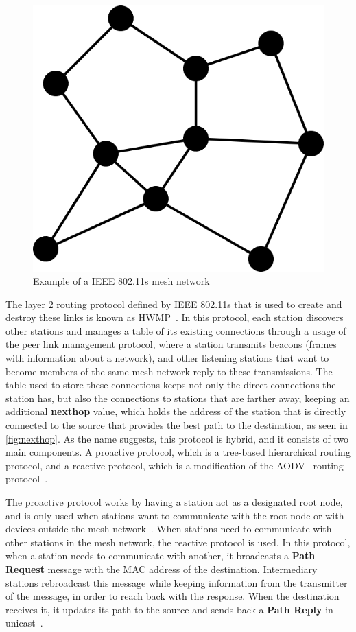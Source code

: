 \begin{figure}[htb]
   \centering
   \includegraphics[scale=.4]{meshnet}
   \caption{Example of a \ac{IEEE} 802.11s mesh network}\label{fig:meshnet}
\end{figure}

The layer 2 routing protocol defined by \ac{IEEE} 802.11s that is used to create
and destroy these links is known as \ac{HWMP}~\cite{ieee80211}. In this
protocol, each station discovers other stations and manages a table of its
existing connections through a usage of the peer link management protocol, where
a station transmits beacons (frames with information about a network), and other
listening stations that want to become members of the same mesh network reply to
these transmissions. The table used to store these connections keeps not only
the direct connections the station has, but also the connections to stations
that are farther away, keeping an additional \textbf{nexthop} value, which holds
the address of the station that is directly connected to the source that
provides the best path to the destination, as seen in \autoref{fig:nexthop}. As
the name suggests, this protocol is hybrid, and it consists of two main
components. A proactive protocol, which is a tree-based hierarchical routing
protocol, and a reactive protocol, which is a modification of the
\ac{AODV}~\cite{aodv} routing protocol~\cite{ieee80211s}.

The proactive protocol works by having a station act as a designated root node,
and is only used when stations want to communicate with the root node or with
devices outside the mesh network~\cite{hwmpproa,hwmpperf}. When stations need to
communicate with other stations in the mesh network, the reactive protocol is
used. In this protocol, when a station needs to communicate with another, it
broadcasts a \textbf{Path Request} message with the \ac{MAC} address of the
destination. Intermediary stations rebroadcast this message while keeping
information from the transmitter of the message, in order to reach back with the
response. When the destination receives it, it updates its path to the source
and sends back a \textbf{Path Reply} in unicast~\cite{hwmpperf}.

